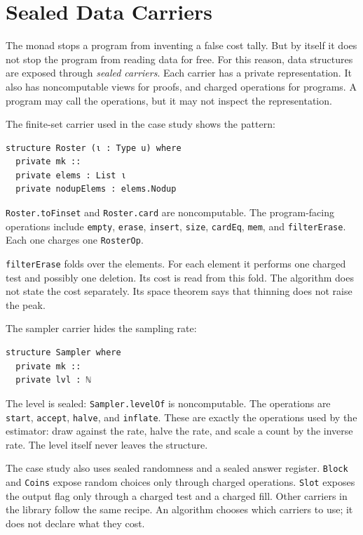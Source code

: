\documentclass[acmsmall,nonacm]{acmart}
\begin{document}
\section{Sealed Data Carriers}\label{sec:carriers}

The monad stops a program from inventing a false cost tally.
But by itself it does not stop the program from reading data for free.
For this reason, data structures are exposed through \emph{sealed carriers}.
Each carrier has a private representation.
It also has noncomputable views for proofs, and charged operations for programs.
A program may call the operations, but it may not inspect the representation.

The finite-set carrier used in the case study shows the pattern:

\begin{lstlisting}
structure Roster (ι : Type u) where
  private mk ::
  private elems : List ι
  private nodupElems : elems.Nodup
\end{lstlisting}

\lstinline{Roster.toFinset} and \lstinline{Roster.card} are noncomputable.
The program-facing operations include \lstinline{empty}, \lstinline{erase}, \lstinline{insert}, \lstinline{size}, \lstinline{cardEq}, \lstinline{mem}, and \lstinline{filterErase}.
Each one charges one \lstinline{RosterOp}.

\lstinline{filterErase} folds over the elements.
For each element it performs one charged test and possibly one deletion.
Its cost is read from this fold.
The algorithm does not state the cost separately.
Its space theorem says that thinning does not raise the peak.

The sampler carrier hides the sampling rate:

\begin{lstlisting}
structure Sampler where
  private mk ::
  private lvl : ℕ
\end{lstlisting}

The level is sealed: \lstinline{Sampler.levelOf} is noncomputable.
The operations are \lstinline{start}, \lstinline{accept}, \lstinline{halve}, and \lstinline{inflate}.
These are exactly the operations used by the estimator: draw against the rate, halve the rate, and scale a count by the inverse rate.
The level itself never leaves the structure.

The case study also uses sealed randomness and a sealed answer register.
\lstinline{Block} and \lstinline{Coins} expose random choices only through charged operations.
\lstinline{Slot} exposes the output flag only through a charged test and a charged fill.
Other carriers in the library follow the same recipe.
An algorithm chooses which carriers to use; it does not declare what they cost.
\end{document}
